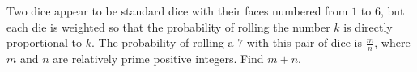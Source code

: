 Two dice appear to be standard dice with their faces numbered from $1$ to $6$, but each die is weighted so that the probability of rolling the number $k$ is directly proportional to $k$. The probability of rolling a $7$ with this pair of dice is $\tfrac{m}{n}$, where $m$ and $n$ are relatively prime positive integers. Find $m + n$.